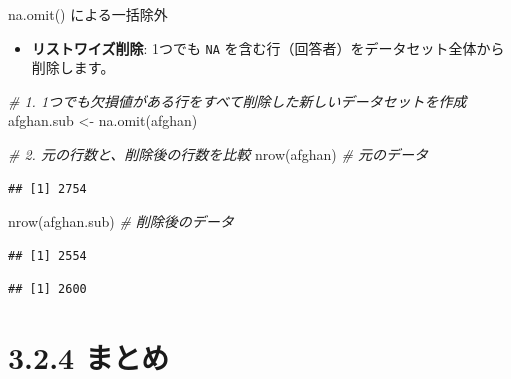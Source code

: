 \documentclass[
  ignorenonframetext,
]{beamer}
\newenvironment{Shaded}{\begin{snugshade}}{\end{snugshade}}
\newcommand{\CommentTok}[1]{\textcolor[rgb]{0.56,0.35,0.01}{\textit{#1}}}
\newcommand{\FunctionTok}[1]{\textcolor[rgb]{0.00,0.00,0.00}{#1}}
\newcommand{\NormalTok}[1]{#1}
\newcommand{\OtherTok}[1]{\textcolor[rgb]{0.56,0.35,0.01}{#1}}
\newcommand{\SpecialCharTok}[1]{\textcolor[rgb]{0.00,0.00,0.00}{#1}}
\providecommand{\tightlist}{%
  \setlength{\itemsep}{0pt}\setlength{\parskip}{0pt}}
\begin{document}
\begin{frame}[fragile]{na.omit() による一括除外}
\protect\hypertarget{na.omit-ux306bux3088ux308bux4e00ux62ecux9664ux5916}{}
\begin{itemize}
\tightlist
\item
  \textbf{リストワイズ削除}: 1つでも \texttt{NA}
  を含む行（回答者）をデータセット全体から削除します。
\end{itemize}

\scriptsize

\begin{Shaded}
\begin{Highlighting}[]
\CommentTok{\# 1. 1つでも欠損値がある行をすべて削除した新しいデータセットを作成}
\NormalTok{afghan.sub }\OtherTok{\textless{}{-}} \FunctionTok{na.omit}\NormalTok{(afghan)}

\CommentTok{\# 2. 元の行数と、削除後の行数を比較}
\FunctionTok{nrow}\NormalTok{(afghan)     }\CommentTok{\# 元のデータ}
\end{Highlighting}
\end{Shaded}

\begin{verbatim}
## [1] 2754
\end{verbatim}

\begin{Shaded}
\begin{Highlighting}[]
\FunctionTok{nrow}\NormalTok{(afghan.sub) }\CommentTok{\# 削除後のデータ}
\end{Highlighting}
\end{Shaded}

\begin{verbatim}
## [1] 2554
\end{verbatim}

\begin{Shaded}
\end{Shaded}

\begin{verbatim}
## [1] 2600
\end{verbatim}

\normalsize
\end{frame}

\hypertarget{ux307eux3068ux3081}{%
\section{3.2.4 まとめ}\label{ux307eux3068ux3081}}
\end{document}
